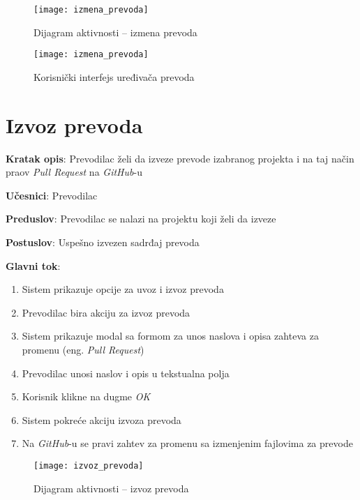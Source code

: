 \begin{figure}[H]
    \centering
    \texttt{[image: izmena\_prevoda]}
    \caption{Dijagram aktivnosti -- izmena prevoda}
\end{figure}

\begin{figure}[H]
    \centering
    \texttt{[image: izmena\_prevoda]}
    \caption{Korisnički interfejs uređivača prevoda}
\end{figure}


\section{Izvoz prevoda}

\textbf{Kratak opis}: Prevodilac želi da izveze prevode izabranog projekta i 
na taj način praov \textit{Pull Request} na \textit{GitHub}-u

\textbf{Učesnici}: Prevodilac

\textbf{Preduslov}: Prevodilac se nalazi na projektu koji želi da izveze

\textbf{Postuslov}: Uspešno izvezen sadrđaj prevoda

\textbf{Glavni tok}:
\begin{enumerate}
    \item Sistem prikazuje opcije za uvoz i izvoz prevoda
    \item Prevodilac bira akciju za izvoz prevoda
    \item Sistem prikazuje modal sa formom za unos naslova i opisa 
    zahteva za promenu (eng. \textit{Pull Request})
    \item Prevodilac unosi naslov i opis u tekstualna polja
    \item Korisnik klikne na dugme \textit{OK}
    \item Sistem pokreće akciju izvoza prevoda
    \item Na \textit{GitHub}-u se pravi zahtev za promenu sa izmenjenim fajlovima za prevode
\end{enumerate}

\begin{figure}[H]
    \centering
    \texttt{[image: izvoz\_prevoda]}
    \caption{Dijagram aktivnosti -- izvoz prevoda}
\end{figure}

